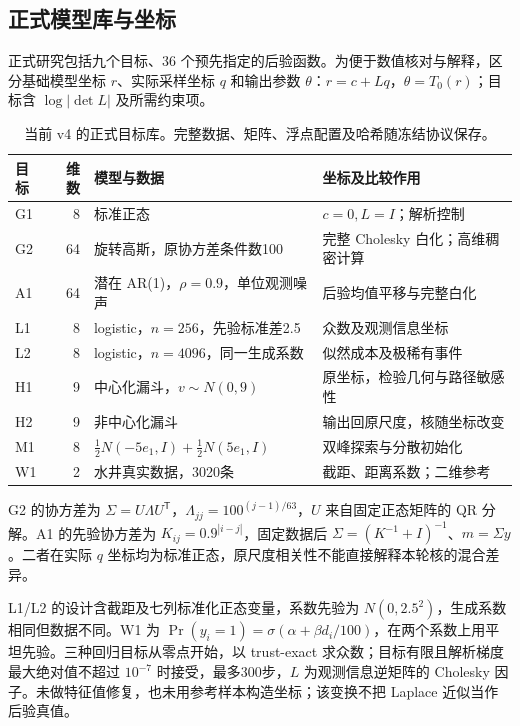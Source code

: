 \subsection{正式模型库与坐标}
正式研究包括九个目标、36 个预先指定的后验函数。为便于数值核对与解释，区分基础模型坐标 $r$、实际采样坐标 $q$ 和输出参数 $\theta$：$r=c+Lq$，$\theta=T_0(r)$；目标含 $\log|\det L|$ 及所需约束项。

\begin{table}[htbp]\centering\smalltable
\begin{tabularx}{\linewidth}{l r Y Y}\toprule
目标 & 维数 & 模型与数据 & 坐标及比较作用\\\midrule
G1 & 8 & 标准正态 & $c=0,L=I$；解析控制\\
G2 & 64 & 旋转高斯，原协方差条件数100 & 完整 Cholesky 白化；高维稠密计算\\
A1 & 64 & 潜在 AR(1)，$\rho=0.9$，单位观测噪声 & 后验均值平移与完整白化\\
L1 & 8 & logistic，$n=256$，先验标准差2.5 & 众数及观测信息坐标\\
L2 & 8 & logistic，$n=4096$，同一生成系数 & 似然成本及极稀有事件\\
H1 & 9 & 中心化漏斗，$v\sim N(0,9)$ & 原坐标，检验几何与路径敏感性\\
H2 & 9 & 非中心化漏斗 & 输出回原尺度，核随坐标改变\\
M1 & 8 & $\frac12N(-5e_1,I)+\frac12N(5e_1,I)$ & 双峰探索与分散初始化\\
W1 & 2 & 水井真实数据，3020条 & 截距、距离系数；二维参考\\\bottomrule
\end{tabularx}
\caption{当前 v4 的正式目标库。完整数据、矩阵、浮点配置及哈希随冻结协议保存。}
\end{table}

G2 的协方差为 $\Sigma=U\Lambda U^\mathsf T$，$\Lambda_{jj}=100^{(j-1)/63}$，$U$ 来自固定正态矩阵的 QR 分解。A1 的先验协方差为 $K_{ij}=0.9^{|i-j|}$，固定数据后 $\Sigma=(K^{-1}+I)^{-1}$、$m=\Sigma y$。二者在实际 $q$ 坐标均为标准正态，原尺度相关性不能直接解释本轮核的混合差异。

L1/L2 的设计含截距及七列标准化正态变量，系数先验为 $N(0,2.5^2)$，生成系数相同但数据不同。W1 为
$\Pr(y_i=1)=\sigma(\alpha+\beta d_i/100)$，在两个系数上用平坦先验。三种回归目标从零点开始，以 trust-exact 求众数；目标有限且解析梯度最大绝对值不超过 $10^{-7}$ 时接受，最多300步，$L$ 为观测信息逆矩阵的 Cholesky 因子。未做特征值修复，也未用参考样本构造坐标；该变换不把 Laplace 近似当作后验真值。

